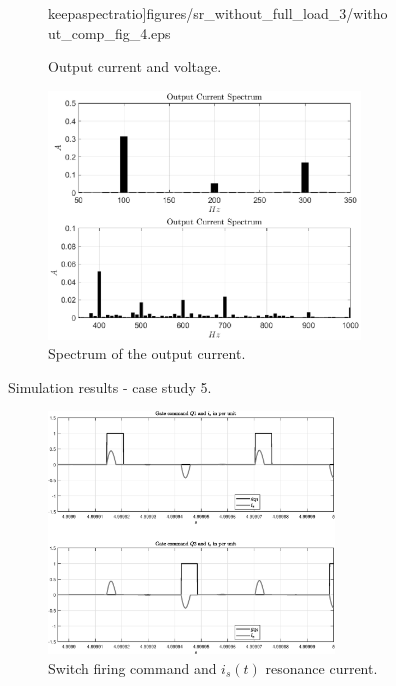 \documentclass[11pt,a4paper,oneside]{book}
\numberwithin{equation}{section}
\theoremstyle{it}
\theoremstyle{definition}
\begin{document}
\begin{onehalfspace}
\begin{figure}[H]
\begin{subfigure}{0.5\textwidth}
		keepaspectratio]{figures/sr_without_full_load_3/without_comp_fig_4.eps}
		\captionsetup{width=0.65\textwidth, font=footnotesize}	
		\caption{Output current and voltage.}
		\label{}
	\end{subfigure}%
	\begin{subfigure}{0.5\textwidth}
		\centering
		\includegraphics[width = 235pt, angle = 0, 
		keepaspectratio]{figures/sr_without_full_load_3/output_current_spectrum.eps}
		\captionsetup{width=0.65\textwidth, font=footnotesize}	
		\caption{Spectrum of the output current.}
		\label{}
	\end{subfigure}
	\captionsetup{width=0.5\textwidth, font=small}	
	\caption{Simulation results - case study 5.}
	\label{}
\end{figure}
\begin{figure}[H]
	\centering
	\begin{subfigure}{0.5\textwidth}
		\centering
		\includegraphics[width = 215pt, angle = 0, 
		keepaspectratio]{figures/sr_without_full_load_3/without_comp_fig_1.eps}
		\captionsetup{width=0.65\textwidth, font=footnotesize}	
		\caption{Switch firing command and $i_s(t)$ resonance current.}
		\label{}
	\end{subfigure}%
	\begin{subfigure}{0.5\textwidth}
		\centering

\end{subfigure}
\end{figure}
\end{onehalfspace}
\end{document}
